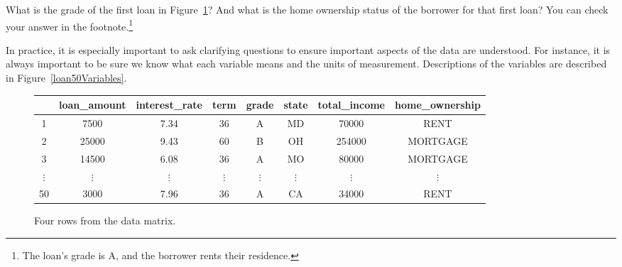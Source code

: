 \begin{exercise}
What is the grade of the first loan in Figure~\ref{loan50DF}?
And what is the home ownership status of the borrower
for that first loan?
You can check your answer in the
footnote.\footnote{The loan's grade is A,
  and the borrower rents their residence.}
\end{exercise}

In practice, it is especially important to ask clarifying
questions to ensure important aspects of the data are understood.
For instance, it is always important to be sure we know what
each variable means and the units of measurement.
Descriptions of the  variables are described
in Figure~\ref{loan50Variables}.

\begin{figure}[h]
\centering
{\small
\begin{tabular}{ccc ccc cc} %
  \hline
   & loan\_amount & interest\_rate & term & grade & state
       & total\_income & home\_ownership \\ %
  \hline
  1 & 7500 & 7.34 & 36 & A & MD & 70000 & RENT \\ %
  2 & 25000 & 9.43 & 60 & B & OH & 254000 & MORTGAGE \\ %
  3 & 14500 & 6.08 & 36 & A & MO & 80000 & MORTGAGE \\ %
  $\vdots$ & $\vdots$ & $\vdots$ & $\vdots$ & $\vdots$ & $\vdots$
      & $\vdots$ & $\vdots$ \\ %
  50 & 3000 & 7.96 & 36 & A & CA & 34000 & RENT \\ %
   \hline
\end{tabular}
}
\caption{Four rows from the  data matrix.}
\label{loan50DF}
\end{figure}

